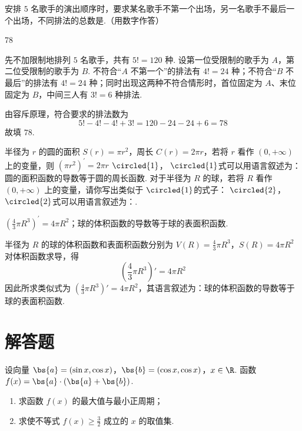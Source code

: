 \begin{problem}
安排 \(5\) 名歌手的演出顺序时，要求某名歌手不第一个出场，另一名歌手不最后一个出场，不同排法的总数是\fillinblank{}.（用数字作答）
\end{problem}

\begin{answer}
78
\end{answer}

\begin{solution}
先不加限制地排列 \(5\) 名歌手，共有 \(5!=120\) 种. 设第一位受限制的歌手为 \(A\)，第二位受限制的歌手为 \(B\). 不符合“\(A\) 不第一个”的排法有 \(4!=24\) 种；不符合“\(B\) 不最后”的排法有 \(4!=24\) 种；同时出现这两种不符合情形时，首位固定为 \(A\)、末位固定为 \(B\)，中间三人有 \(3!=6\) 种排法.

由容斥原理，符合要求的排法数为
\[
5!-4!-4!+3!=120-24-24+6=78
\]
故填 \(78\).
\end{solution}

\begin{problem}
半径为 \(r\) 的圆的面积 \(S(r) = \pi r^2\)，周长 \(C(r) = 2\pi r\)，若将 \(r\) 看作 \((0, +\infty)\) 上的变量，则 \((\pi r^2)^\prime = 2\pi r\) \(\circled{1}\)，
\(\circled{1}\)式可以用语言叙述为：圆的面积函数的导数等于圆的周长函数.
对于半径为 \(R\) 的球，若将 \(R\) 看作 \((0, +\infty)\) 上的变量，请你写出类似于
\(\circled{1}\)的式子：\fillinblank{} \(\circled{2}\)，
\(\circled{2}\)式可以用语言叙述为：\fillinblank{}.
\end{problem}

\begin{answer}
\(\left(\frac{4}{3}\pi R^3\right)^\prime = 4\pi R^2\)；球的体积函数的导数等于球的表面积函数.
\end{answer}

\begin{solution}
半径为 \(R\) 的球的体积函数和表面积函数分别为
\(V(R)=\frac43\pi R^3\)，\(S(R)=4\pi R^2\)
对体积函数求导，得
\[
\left(\frac43\pi R^3\right)'=4\pi R^2
\]
因此所求类似式为 \(\left(\frac43\pi R^3\right)'=4\pi R^2\)，其语言叙述为：球的体积函数的导数等于球的表面积函数.
\end{solution}

\section{解答题}
\begin{problem}
设向量 \(\bs{a} = (\sin x, \cos x)\)，\(\bs{b} = (\cos x, \cos x)\)，\(x \in \R\). 函数 \(f(x) = \bs{a} \cdot (\bs{a} + \bs{b})\).

\begin{enumerate}
\item 求函数 \(f(x)\) 的最大值与最小正周期；
\item 求使不等式 \(f(x) \geqslant \frac{3}{2}\) 成立的 \(x\) 的取值集.
\end{enumerate}
\end{problem}

